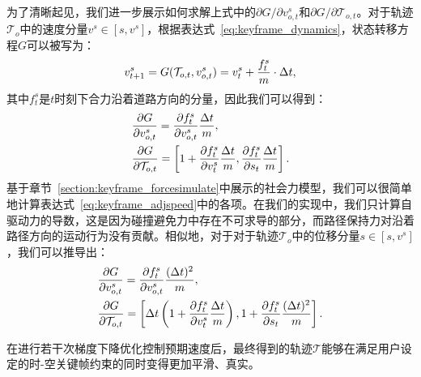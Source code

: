 为了清晰起见，我们进一步展示如何求解上式中的${\partial G}/{\partial v^s_{o,t}}$和${\partial G}/{\partial \mathcal{T}_{o,t}}$。对于轨迹$\mathcal{T}_{o}$中的速度分量$v^s\in[s, v^s]$，根据表达式~\ref{eq:keyframe_dynamics}，状态转移方程$G$可以被写为：
\begin{equation}
\setlength\abovedisplayskip{7pt}
\setlength\belowdisplayskip{7pt}
\label{eq:keyframe_adjspeedtrans}
    v^s_{t+1} = G(\mathcal{T}_{o,t}, v^s_{o,t}) = v^s_{t} + \frac{f^s_t}{m} \cdot \Delta{t},
\end{equation}
其中$f^s_t$是$t$时刻下合力沿着道路方向的分量，因此我们可以得到：
\begin{equation}
\setlength\abovedisplayskip{10pt}
\setlength\belowdisplayskip{10pt}
\label{eq:keyframe_adjspeed}
\begin{aligned}
    & \frac{\partial G}{\partial v^s_{o,t}} = \frac{\partial f^s_t}{\partial v^s_{o,t}} \frac{\Delta{t}}{m}, \\
    & \frac{\partial G}{\partial \mathcal{T}_{o,t}} = 
    \left[
        1 + \frac{\partial f^s_t}{\partial v^s_t} \frac{\Delta{t}}{m}, \frac{\partial f^s_t}{\partial s_t} \frac{\Delta{t}}{m}
    \right].
\end{aligned}
\end{equation}
基于章节~\ref{section:keyframe_forcesimulate}中展示的社会力模型，我们可以很简单地计算表达式~\ref{eq:keyframe_adjspeed}中的各项。在我们的实现中，我们只计算自驱动力的导数，这是因为碰撞避免力中存在不可求导的部分，而路径保持力对沿着路径方向的运动行为没有贡献。相似地，对于对于轨迹$\mathcal{T}_{o}$中的位移分量$s\in[s, v^s]$，我们可以推导出：
\begin{equation}
\setlength\abovedisplayskip{10pt}
\setlength\belowdisplayskip{10pt}
\label{eq:keyframe_adjpos}
\begin{aligned}
    & \frac{\partial G}{\partial v^s_{o,t}} = \frac{\partial f^s_t}{\partial v^s_{o,t}} \frac{(\Delta{t})^2}{m}, \\
    & \frac{\partial G}{\partial \mathcal{T}_{o,t}} =
    \left[
        \Delta{t}\left( 1 + \frac{\partial f^s_t}{\partial v^s_t} \frac{\Delta{t}}{m} \right), 1 + \frac{\partial f^s_t}{\partial s_t} \frac{(\Delta{t})^2}{m}
    \right].
\end{aligned}
\end{equation}

在进行若干次梯度下降优化控制预期速度后，最终得到的轨迹$\mathcal{T}$能够在满足用户设定的时-空关键帧约束的同时变得更加平滑、真实。


